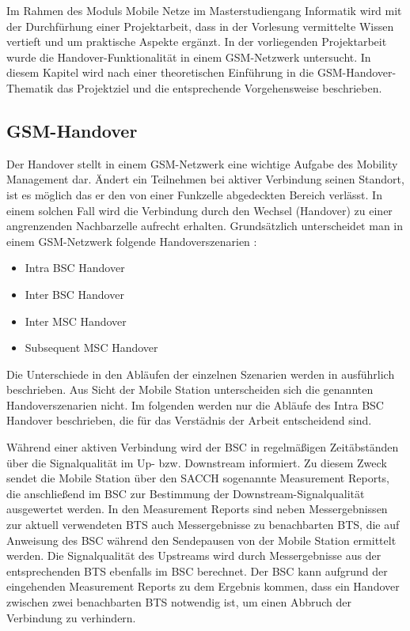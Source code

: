 
Im Rahmen des Moduls Mobile Netze im Masterstudiengang Informatik wird mit der Durchfürhung einer Projektarbeit, dass in der Vorlesung vermittelte Wissen vertieft und um praktische Aspekte ergänzt. In der vorliegenden Projektarbeit wurde die Handover-Funktionalität in einem GSM-Netzwerk untersucht. In diesem Kapitel wird nach einer theoretischen Einführung in die GSM-Handover-Thematik das Projektziel und die entsprechende Vorgehensweise beschrieben.

\subsection{GSM-Handover}\label{sec:handover}

Der Handover stellt in einem GSM-Netzwerk eine wichtige Aufgabe des Mobility Management dar. Ändert ein Teilnehmen bei aktiver Verbindung seinen Standort, ist es möglich das er den von einer Funkzelle abgedeckten Bereich verlässt. In einem solchen Fall wird die Verbindung durch den Wechsel (Handover) zu einer angrenzenden Nachbarzelle aufrecht erhalten. Grundsätzlich unterscheidet man in einem GSM-Netzwerk folgende Handoverszenarien \cite{bib:grundkursmks}:

\begin{itemize}
 \item Intra BSC Handover
 \item Inter BSC Handover
 \item Inter MSC Handover
 \item Subsequent MSC Handover
\end{itemize}

Die Unterschiede in den Abläufen der einzelnen Szenarien werden in \cite{bib:grundkursmks} ausführlich beschrieben. Aus Sicht der Mobile Station unterscheiden sich die genannten Handoverszenarien nicht. Im folgenden werden nur die Abläufe des Intra BSC Handover beschrieben, die für das Verstädnis der Arbeit entscheidend sind.

Während einer aktiven Verbindung wird der BSC in regelmäßigen Zeitäbständen über die Signalqualität im Up- bzw. Downstream informiert. Zu diesem Zweck sendet die Mobile Station über den SACCH sogenannte Measurement Reports, die anschließend im BSC zur Bestimmung der Downstream-Signalqualität ausgewertet werden. In den Measurement Reports sind neben Messergebnissen zur aktuell verwendeten BTS auch Messergebnisse zu benachbarten BTS, die auf Anweisung des BSC während den Sendepausen von der Mobile Station ermittelt werden. Die Signalqualität des Upstreams wird durch Messergebnisse aus der entsprechenden BTS ebenfalls im BSC berechnet. Der BSC kann aufgrund der eingehenden Measurement Reports zu dem Ergebnis kommen, dass ein Handover zwischen zwei benachbarten BTS notwendig ist, um einen Abbruch der Verbindung zu verhindern.

